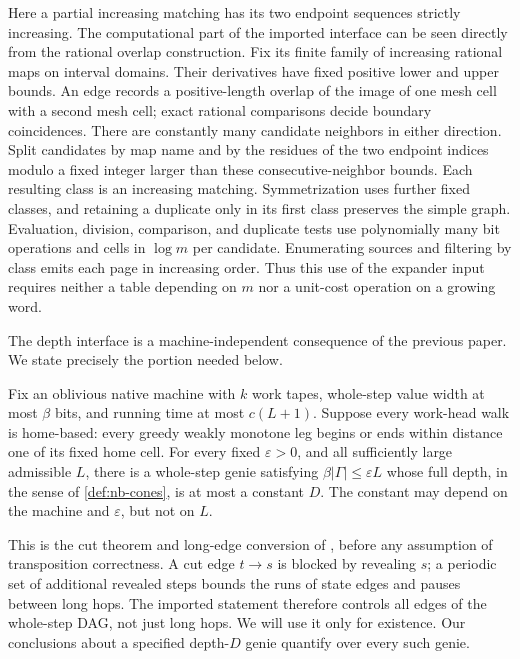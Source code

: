 Here a partial increasing matching has its two endpoint sequences strictly
increasing.  The computational part of the imported interface can be seen
directly from the rational overlap construction.  Fix its finite family
of increasing rational maps on interval domains.  Their derivatives have
fixed positive lower and upper bounds.  An edge records a positive-length
overlap of the image of one mesh cell with a second mesh cell; exact
rational comparisons decide boundary coincidences.  There are constantly
many candidate neighbors in either direction.  Split candidates by map
name and by the residues of the two endpoint indices modulo a fixed
integer larger than these consecutive-neighbor bounds.  Each resulting
class is an increasing matching.  Symmetrization uses further fixed
classes, and retaining a duplicate only in its first class preserves the
simple graph.  Evaluation, division, comparison, and duplicate tests use
polynomially many bit operations and cells in $\log m$ per candidate.
Enumerating sources and filtering by class emits each page in increasing
order.  Thus this use of the expander input requires neither a table
depending on $m$ nor a unit-cost operation on a growing word.

The depth interface is a machine-independent consequence of the previous
paper.  We state precisely the portion needed below.

\begin{lemma}
\label{lem:ne-depth-import}
Fix an oblivious native machine with $k$ work tapes, whole-step value width
at most $\beta$ bits, and running time at most $c(L+1)$.  Suppose every
work-head walk is home-based: every greedy weakly monotone leg begins or
ends within distance one of its fixed home cell.  For every fixed
$\varepsilon>0$, and all sufficiently large admissible $L$, there is a
whole-step genie satisfying $\beta|\Gamma|\le\varepsilon L$ whose full
depth, in the sense of \cref{def:nb-cones}, is at most a constant $D$.
The constant may
depend on the machine and $\varepsilon$, but not on $L$.
\end{lemma}

This is the cut theorem and long-edge conversion of
\cite[Theorem B and the proof of Corollary B]{BrendeCurved}, before any
assumption of transposition correctness.  A cut edge $t\to s$ is blocked
by revealing $s$; a periodic set of additional revealed steps bounds the
runs of state edges and pauses between long hops.  The imported statement
therefore controls all edges of the whole-step DAG, not just long hops.
We will use it only for existence.  Our conclusions about a specified
depth-$D$ genie quantify over every such genie.

